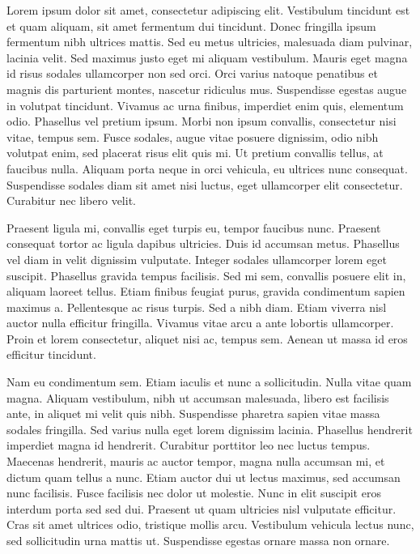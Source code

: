 Lorem ipsum dolor sit amet, consectetur adipiscing elit. Vestibulum tincidunt est et quam aliquam, sit amet fermentum dui tincidunt. Donec fringilla ipsum fermentum nibh ultrices mattis. Sed eu metus ultricies, malesuada diam pulvinar, lacinia velit. Sed maximus justo eget mi aliquam vestibulum. Mauris eget magna id risus sodales ullamcorper non sed orci. Orci varius natoque penatibus et magnis dis parturient montes, nascetur ridiculus mus. Suspendisse egestas augue in volutpat tincidunt. Vivamus ac urna finibus, imperdiet enim quis, elementum odio. Phasellus vel pretium ipsum. Morbi non ipsum convallis, consectetur nisi vitae, tempus sem. Fusce sodales, augue vitae posuere dignissim, odio nibh volutpat enim, sed placerat risus elit quis mi. Ut pretium convallis tellus, at faucibus nulla. Aliquam porta neque in orci vehicula, eu ultrices nunc consequat. Suspendisse sodales diam sit amet nisi luctus, eget ullamcorper elit consectetur. Curabitur nec libero velit.

Praesent ligula mi, convallis eget turpis eu, tempor faucibus nunc. Praesent consequat tortor ac ligula dapibus ultricies. Duis id accumsan metus. Phasellus vel diam in velit dignissim vulputate. Integer sodales ullamcorper lorem eget suscipit. Phasellus gravida tempus facilisis. Sed mi sem, convallis posuere elit in, aliquam laoreet tellus. Etiam finibus feugiat purus, gravida condimentum sapien maximus a. Pellentesque ac risus turpis. Sed a nibh diam. Etiam viverra nisl auctor nulla efficitur fringilla. Vivamus vitae arcu a ante lobortis ullamcorper. Proin et lorem consectetur, aliquet nisi ac, tempus sem. Aenean ut massa id eros efficitur tincidunt.

Nam eu condimentum sem. Etiam iaculis et nunc a sollicitudin. Nulla vitae quam magna. Aliquam vestibulum, nibh ut accumsan malesuada, libero est facilisis ante, in aliquet mi velit quis nibh. Suspendisse pharetra sapien vitae massa sodales fringilla. Sed varius nulla eget lorem dignissim lacinia. Phasellus hendrerit imperdiet magna id hendrerit. Curabitur porttitor leo nec luctus tempus. Maecenas hendrerit, mauris ac auctor tempor, magna nulla accumsan mi, et dictum quam tellus a nunc. Etiam auctor dui ut lectus maximus, sed accumsan nunc facilisis. Fusce facilisis nec dolor ut molestie. Nunc in elit suscipit eros interdum porta sed sed dui. Praesent ut quam ultricies nisl vulputate efficitur. Cras sit amet ultrices odio, tristique mollis arcu. Vestibulum vehicula lectus nunc, sed sollicitudin urna mattis ut. Suspendisse egestas ornare massa non ornare.


